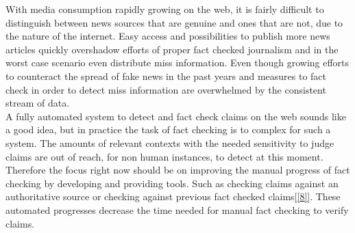\documentclass[10pt]{article}
\begin{document}
With media consumption rapidly growing on the web, it is fairly difficult to distinguish between news sources that are genuine and ones that are not, due to the nature of the internet.
Easy access and possibilities to publish more news articles quickly overshadow efforts of proper fact checked journalism and in the worst case scenario even distribute miss information.
Even though growing efforts to counteract the spread of fake news in the past years and measures to fact check in order to detect miss information are overwhelmed by the consistent stream of data.\\
A fully automated system to detect and fact check claims on the web sounds like a good idea, but in practice the task of fact checking is to complex for such a system.
The amounts of relevant contexts with the needed sensitivity to judge claims are out of reach, for non human instances, to detect at this moment.
Therefore the focus right now should be on improving the manual progress of fact checking by developing and providing tools.
Such as checking claims against an authoritative source or checking against previous fact checked claims\ref{[8]}.
These automated progresses decrease the time needed for manual fact checking to verify claims.

\end{document}
